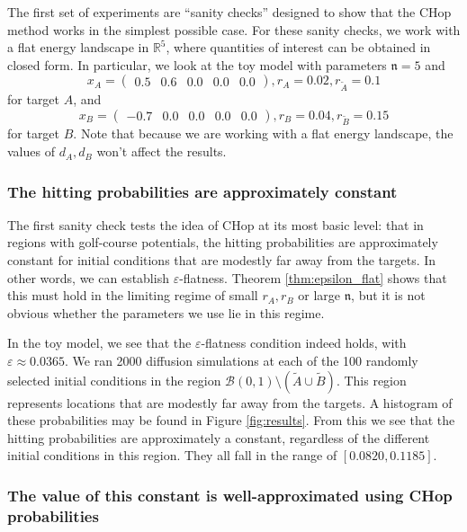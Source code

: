 \documentclass[english, aip, jcp, priprint, graphicx,floatfix]{revtex4-1}
\theoremstyle{plain}
\theoremstyle{definition}
\theoremstyle{plain}
\newcommand{\dimension}{{\mathfrak{n}}}
\begin{document}
The first set of experiments are ``sanity checks'' designed to show that the CHop method works in the simplest possible case.  For these sanity checks, we work with a flat energy landscape in $\mathbb{R}^5$, where quantities of interest can be obtained in closed form.  In particular, we look at the toy model with parameters $\dimension = 5$ and
\begin{equation*}
x_A = \begin{pmatrix}%
0.5&0.6&0.0&0.0&0.0%
\end{pmatrix},
r_A = 0.02, r_{\tilde{A}} = 0.1
\end{equation*}
for target $A$, and
\begin{equation*}
x_B = \begin{pmatrix}%
-0.7&0.0&0.0&0.0&0.0%
\end{pmatrix},
r_B = 0.04, r_{\tilde{B}} = 0.15
\end{equation*}
for target $B$. Note that because we are working with a flat energy landscape, the values of $d_A, d_B$ won't affect the results.

\subsubsection{The hitting probabilities are approximately constant}

The first sanity check tests the idea of CHop at its most basic level: that in regions with golf-course potentials, the hitting probabilities are approximately constant for initial conditions that are modestly far away from the targets. In other words, we can establish $\varepsilon$-flatness.  Theorem \ref{thm:epsilon_flat} shows that this must hold in the limiting regime of small $r_A,r_B$ or large $\dimension$, but it is not obvious whether the parameters we use lie in this regime.  

In the toy model, we see that the $\varepsilon$-flatness condition indeed holds, with $\varepsilon \approx 0.0365$.  We ran 2000 diffusion simulations at each of the 100 randomly selected initial conditions in the region $\mathcal{B}(0, 1) \setminus (\tilde{A} \cup \tilde{B})$. This region represents locations that are modestly far away from the targets.  A histogram of these probabilities may be found in Figure \ref{fig:results}.  From this we see that the hitting probabilities are approximately a constant, regardless of the different initial conditions in this region. They all fall in the range of $[0.0820, 0.1185]$.


\subsubsection{The value of this constant is well-approximated using CHop probabilities}
\end{document}
